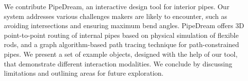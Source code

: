 We contribute PipeDream, an interactive design tool for interior pipes. Our system addresses various challenges makers are likely to encounter, such as avoiding intersections and ensuring maximum bend angles. PipeDream offers 3D point-to-point routing of internal pipes based on physical simulation of flexible rods, and a graph algorithm-based path tracing technique for path-constrained pipes. We present a set of example objects, designed with the help of our tool, that demonstrate different interaction modalities. We conclude by discussing limitations and outlining areas for future exploration. 

